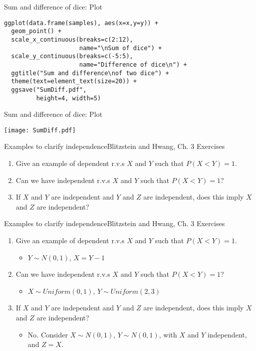 \documentclass{beamer}
\begin{document}
\begin{frame}[fragile]{Sum and difference of dice: Plot}
\pause
\begin{verbatim}
ggplot(data.frame(samples), aes(x=x,y=y)) +
  geom_point() +
  scale_x_continuous(breaks=c(2:12),
                     name="\nSum of dice") +
  scale_y_continuous(breaks=c(-5:5),
                     name="Difference of dice\n") +
  ggtitle("Sum and difference\nof two dice") +
  theme(text=element_text(size=20)) +
  ggsave("SumDiff.pdf",
         height=4, width=5)
\end{verbatim}
\end{frame}

\begin{frame}[fragile]{Sum and difference of dice: Plot}
\begin{center}\texttt{[image: SumDiff.pdf]}\end{center}
\end{frame}

\begin{frame}{Examples to clarify independence}{Blitzstein and Hwang, Ch. 3 Exercises}
\begin{enumerate}
\item Give an example of dependent r.v.s $X$ and $Y$ such that $P(X<Y)=1$.
\item Can we have independent r.v.s $X$ and $Y$ such that $P(X<Y)=1$?
\item If $X$ and $Y$ are independent and $Y$ and $Z$ are independent, does this imply $X$ and $Z$ are independent?
\end{enumerate}
\end{frame}

\begin{frame}{Examples to clarify independence}{Blitzstein and Hwang, Ch. 3 Exercises}
\begin{enumerate}
\item Give an example of dependent r.v.s $X$ and $Y$ such that $P(X<Y)=1$.
\begin{itemize}
\item $Y\sim N(0,1)$, $X=Y-1$
\end{itemize}
\item Can we have independent r.v.s $X$ and $Y$ such that $P(X<Y)=1$?
\begin{itemize}
\item $X\sim Uniform(0,1)$, $Y\sim Uniform(2,3)$
\end{itemize}
\item If $X$ and $Y$ are independent and $Y$ and $Z$ are independent, does this imply $X$ and $Z$ are independent?
\begin{itemize}
\item No. Consider $X\sim N(0,1)$, $Y\sim N(0,1)$, with $X$ and $Y$ independent, and $Z=X$.
\end{itemize}
\end{enumerate}
\end{frame}
\end{document}

